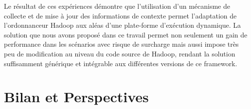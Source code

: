Le résultat de ces expériences démontre que l'utilisation d'un mécanisme de collecte et de mise à jour des informations de contexte permet l'adaptation de l'ordonnanceur Hadoop aux aléas d'une plate-forme d'exécution dynamique. La solution que nous avons proposé dans ce travail permet non seulement un gain de performance dans les scénarios avec risque de surcharge mais aussi impose très peu de modification au niveau du code source de Hadoop, rendant la solution suffisamment générique et intégrable aux différentes versions de ce framework. 


\section{Bilan et Perspectives} \label{sec:disc}








